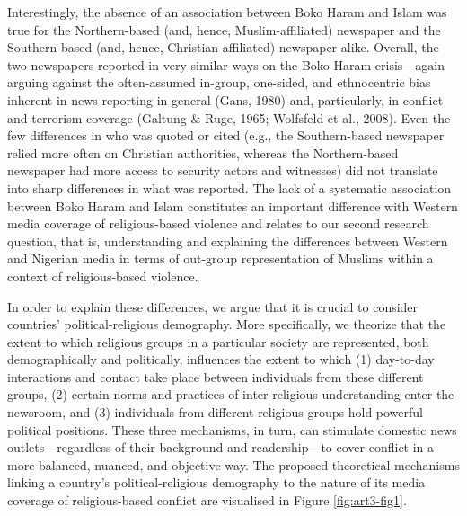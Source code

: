 Interestingly, the absence of an association between Boko Haram and Islam was true for the Northern-based (and, hence, Muslim-affiliated) newspaper and the Southern-based (and, hence, Christian-affiliated) newspaper alike. Overall, the two newspapers reported in very similar ways on the Boko Haram crisis---again arguing against the often-assumed in-group, one-sided, and ethnocentric bias inherent in news reporting in general (Gans, 1980) and, particularly, in conflict and terrorism coverage (Galtung \& Ruge, 1965; Wolfsfeld et al., 2008). Even the few differences in who was quoted or cited (e.g., the Southern-based newspaper relied more often on Christian authorities, whereas the Northern-based newspaper had more access to security actors and witnesses) did not translate into sharp differences in what was reported.  The lack of a systematic association between Boko Haram and Islam constitutes an important difference with Western media coverage of religious-based violence and relates to our second research question, that is, understanding and explaining the differences between Western and Nigerian media in terms of out-group representation of Muslims within a context of religious-based violence. 


In order to explain these differences, we argue that it is crucial to consider countries' political-religious demography. More specifically, we theorize that the extent to which religious groups in a particular society are represented, both demographically and politically, influences the extent to which (1) day-to-day interactions and contact take place between individuals from these different groups, (2) certain norms and practices of inter-religious understanding enter the newsroom, and (3) individuals from different religious groups hold powerful political positions. These three mechanisms, in turn, can stimulate domestic news outlets---regardless of their background and readership---to cover conflict in a more balanced, nuanced, and objective way. The proposed theoretical mechanisms linking a country's political-religious demography to the nature of its media coverage of religious-based conflict are visualised in Figure \ref{fig:art3-fig1}.


